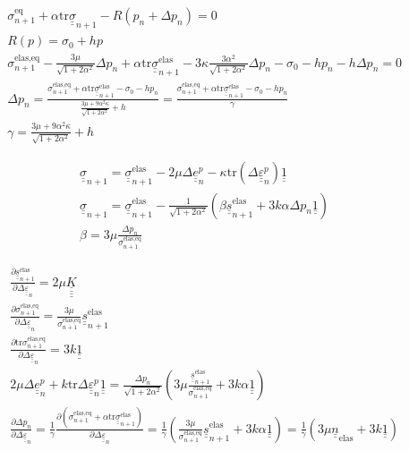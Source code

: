 \documentclass[12pt]{article}
\newcommand\ul[1]{\underline{#1}}
\newcommand\uusigma{\ul{\ul{\sigma}}}
\newcommand\uus{\ul{\ul{s}}}
\newcommand\uue{\ul{\ul{e}}}
\newcommand\uuUnit{\ul{\ul{1}}}
\newcommand\uueps{\ul{\ul{\varepsilon}}}
\newcommand{\uuuuK}{\ul{\ul{\ul{\ul{K}}}}}
\newcommand\Deltaepsp{\Delta \uueps_{n}^p}
\newcommand\Deltaeps{\Delta \uueps_{n}}
\newcommand\Deltaep{\Delta \uue_{n}^p}
\newcommand\sigmaeqn{\sigma_{n+1}^\text{eq}}
\newcommand\sigmaeqnelas{\sigma_{n+1}^\text{elas,eq}}
\newcommand\uusn{\uus_{n+1}}
\newcommand\uusnelas{\uus_{n+1}^\text{elas}}
\newcommand\uusigman{\ul{\ul{\sigma}}_{n+1}}
\newcommand\uusigmanelas{\uusigman^{\text{elas}}}
\newcommand{\uunelas}{\ul{\ul{n}}_\text{elas}}
\newcommand\mtr{\mathrm{tr}}
\begin{document}
\begin{align}
    & \sigmaeqn + \alpha \mtr \uusigman - R(p_n + \Delta p_n) = 0 \\
    & R(p) = \sigma_0 + h p \\
    & \sigmaeqnelas - \frac{3\mu}{\sqrt{1 + 2\alpha^2}}\Delta p_n + \alpha \mtr \uusigmanelas - 3\kappa \frac{3\alpha^2}{\sqrt{1 + 2\alpha^2}} \Delta p_n - \sigma_0 - h p_n - h \Delta p_n = 0 \\
    & \Delta p_n = \frac{ \sigmaeqnelas + \alpha \mtr \uusigmanelas - \sigma_0 - h p_n}{ \frac{3\mu + 9\alpha^2\kappa}{\sqrt{1 + 2\alpha^2}} + h} = \frac{ \sigmaeqnelas + \alpha \mtr \uusigmanelas - \sigma_0 - h p_n}{ \gamma } \\
    & \gamma = \frac{3\mu + 9\alpha^2\kappa}{\sqrt{1 + 2\alpha^2}} + h
\end{align}

\begin{align}
    & \uusigma_{n+1} = \uusigma_{n+1}^\text{elas} - 2\mu \Deltaep - \kappa \mtr (\Deltaepsp) \uuUnit \\
    & \uusigma_{n+1} = \uusigma_{n+1}^\text{elas} - \frac{1}{\sqrt{1 + 2\alpha^2}}\left( \beta \uusnelas + 3k\alpha \Delta p_n \uuUnit \right) \\
    & \beta = 3\mu\frac{\Delta p_n}{\sigmaeqnelas} 
\end{align}

\begin{align}
    & \frac{\partial \uusnelas{}}{\partial \Deltaeps} = 2\mu \uuuuK\\
    & \frac{\partial \sigmaeqnelas{}}{\partial \Deltaeps} = \frac{3\mu}{\sigmaeqnelas}\uusnelas \\
    & \frac{\partial\mtr\sigmaeqnelas}{\partial\Deltaeps} = 3k\uuUnit \\
    & 2\mu\Deltaep + k\mtr\Deltaepsp\uuUnit = \frac{\Delta p_n}{\sqrt{1 + 2\alpha^2}} \left( 3\mu \frac{\uusnelas}{\sigmaeqnelas} + 3k\alpha \uuUnit  \right) \\
    & \frac{\partial\Delta p_n}{\partial\Deltaeps} = \frac{1}{\gamma} \frac{\partial(\sigmaeqnelas + \alpha \mtr \uusigmanelas)}{\partial\Deltaeps} = \frac{1}{\gamma} \left( \frac{3\mu}{\sigmaeqnelas}\uusnelas + 3k\alpha\uuUnit \right) = \frac{1}{\gamma}(3\mu \uunelas + 3k\uuUnit)
\end{align}
\end{document}
